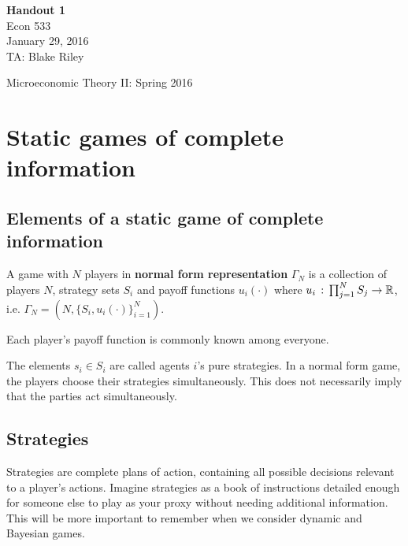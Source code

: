 \documentclass[10pt]{article}
\def\HandoutNumber{1}
\def\TheDate{January 29, 2016}
\def\TheYear{2016}
\def\Name{Blake Riley}
\begin{document}
\begin{spacing}{1.0}

\noindent
\textbf{Handout \HandoutNumber} \\
Econ 533 \\
\TheDate \\
TA: \Name \\

\begin{center}
{\Large Microeconomic Theory II: Spring \TheYear}
\end{center}

\section{Static games of complete information}

\subsection{Elements of a static game of complete
  information}

\begin{definition}
  A game with $N$ players in \textbf{normal form
    representation} $\Gamma_N$ is a collection of players
    $N$, strategy sets $S_i$ and payoff functions
    $u_i(\cdot)$ where $u_i \,:\, \prod_{j=1}^N S_j \to
    \mathbb{R}$, i.e. $\Gamma_N = \left(N, \{S_i, u_i(\cdot)\}_{i=1}^N\right)$.
\end{definition}

\begin{definition}
  Each player's payoff function is commonly known among everyone.
\end{definition}

The elements $s_i \in S_i$ are called agents $i$'s pure strategies. In a
normal form game, the players choose their strategies simultaneously. This
does not necessarily imply that the parties act simultaneously.

\subsection{Strategies}

Strategies are complete plans of action, containing all possible decisions
relevant to a player's actions. Imagine strategies as a book of
instructions detailed enough for someone else to play as your proxy without
needing additional information. This will be more important to remember
when we consider dynamic and Bayesian games.


\end{spacing}
\end{document}
